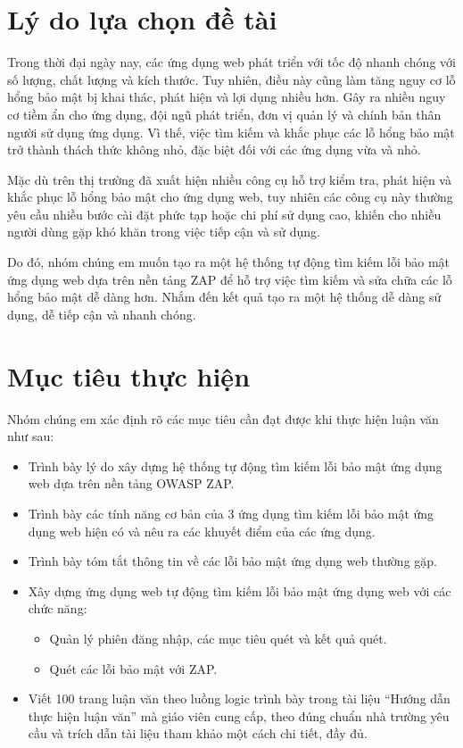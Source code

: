 \section{Lý do lựa chọn đề tài}

\tab Trong thời đại ngày nay, các ứng dụng web phát triển với tốc độ nhanh chóng với số lượng, chất lượng và kích thước.
Tuy nhiên, điều này cũng làm tăng nguy cơ lỗ hổng bảo mật bị khai thác, phát hiện và lợi dụng nhiều hơn.
Gây ra nhiều nguy cơ tiềm ẩn cho ứng dụng, đội ngũ phát triển, đơn vị quản lý và chính bản thân người sử dụng ứng dụng.
Vì thế, việc tìm kiếm và khắc phục các lỗ hổng bảo mật trở thành thách thức không nhỏ, đặc biệt đối với các ứng dụng vừa và nhỏ.
\par

Mặc dù trên thị trường đã xuất hiện nhiều công cụ hỗ trợ kiểm tra, phát hiện và khắc phục lỗ hổng bảo mật cho ứng
dụng web, tuy nhiên các công cụ này thường yêu cầu nhiều bước cài đặt phức tạp hoặc chi phí sử dụng cao, khiến cho nhiều người dùng gặp khó khăn trong việc tiếp cận và sử dụng.
\par

Do đó, nhóm chúng em muốn tạo ra một hệ thống tự động tìm kiếm lỗi bảo mật ứng dụng web dựa trên nền tảng ZAP để hỗ trợ việc tìm kiếm và sửa chữa các lỗ hổng bảo mật dễ dàng hơn.
Nhắm đến kết quả tạo ra một hệ thống dễ dàng sử dụng, dễ tiếp cận và nhanh chóng.

\newpage
\section{Mục tiêu thực hiện}

Nhóm chúng em xác định rõ các mục tiêu cần đạt được khi thực hiện luận văn như sau:

\begin{itemize}
    \item Trình bày lý do xây dựng hệ thống tự động tìm kiếm lỗi bảo mật ứng dụng web dựa trên nền tảng OWASP ZAP.
    \item Trình bày các tính năng cơ bản của 3 ứng dụng tìm kiếm lỗi bảo mật ứng dụng web hiện có và nêu ra các khuyết điểm của các ứng dụng.
    \item Trình bày tóm tắt thông tin về các lỗi bảo mật ứng dụng web thường gặp.
    \item Xây dựng ứng dụng web tự động tìm kiếm lỗi bảo mật ứng dụng web với các chức năng:
          \begin{itemize}
              \item Quản lý phiên đăng nhập, các mục tiêu quét và kết quả quét.
              \item Quét các lỗi bảo mật với ZAP.
          \end{itemize}
    \item Viết 100 trang luận văn theo luồng logic trình bày trong tài liệu “Hướng dẫn thực hiện luận văn” mà giáo viên cung cấp, theo đúng chuẩn nhà trường yêu cầu và trích dẫn tài liệu tham khảo một cách chi tiết, đầy đủ.
\end{itemize}

